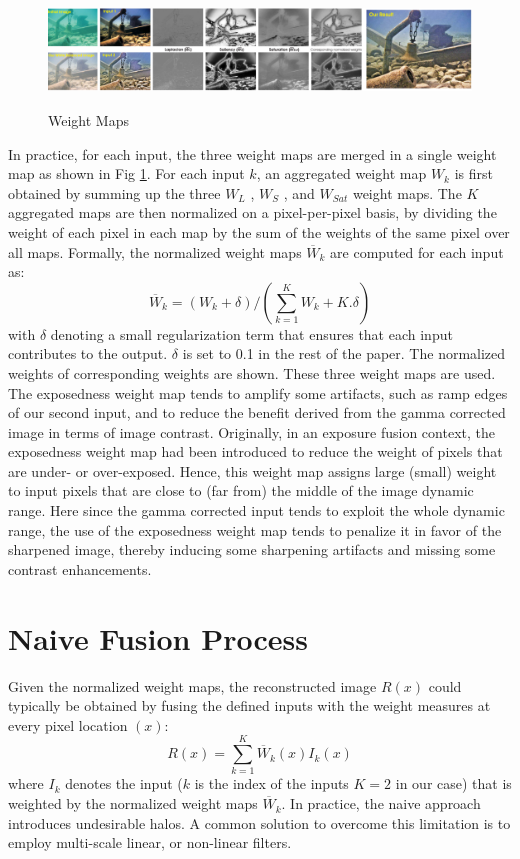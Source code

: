 \documentclass[hidelinks, 12pt]{report}
\begin{document}
\begin{figure}[H]
\centering
\includegraphics[width=15cm,height=3cm]{Weight.png}
\caption[Weight Maps]{Weight Maps}
\label{Weight}
\end{figure}
In practice, for each input, the three weight maps are merged in a single weight map as shown in Fig \ref{Weight}. For each input $k$, an aggregated weight map $W_k$ is first obtained by summing up the three $W_L$ , $W_S$ , and $W_{Sat}$ weight maps. The $K$ aggregated maps are then normalized on a pixel-per-pixel basis, by dividing the weight of each pixel in each map by the sum of the weights of the same pixel over all maps. Formally, the
normalized weight maps $\overline{W}_k$ are computed for each input as:
\begin{equation}
\overline{W}_{k}=(W_k+\delta)/(\sum_{k=1}^{K}W_k + K.\delta)
\end{equation}
with $\delta$ denoting a small regularization term that ensures that each input contributes to the output. $\delta$ is set to 0.1 in the rest of the paper. The normalized weights of corresponding weights are shown. These three weight maps are used\cite{vd}. The exposedness weight map tends to amplify some artifacts, such as ramp edges of our second input, and to reduce the benefit derived from the gamma corrected image in terms of image contrast. Originally, in an exposure fusion context, the exposedness weight map had been introduced to reduce the weight of pixels that are under- or over-exposed. Hence, this weight map assigns large (small) weight to input pixels that are close to (far from) the middle of the image dynamic range. Here since the gamma corrected input tends to exploit the whole dynamic range, the use of the exposedness weight map tends to penalize it in favor of the sharpened image, thereby inducing some sharpening artifacts and missing some contrast enhancements.

\section{Naive Fusion Process}
Given the normalized weight maps, the reconstructed image $R(x)$ could typically be obtained by fusing the defined inputs with the weight measures at every pixel location $(x)$:
\begin{equation}
R(x)=\sum_{k=1}^{K}\overline{W}_k(x)I_k(x)
\end{equation}
where $I_k$ denotes the input ($k$ is the index of the inputs $K=2$ in our case) that is weighted by the normalized weight maps $\overline{W}_k$. In practice, the naive approach introduces undesirable halos\cite{vd}. A common solution to overcome this limitation is to employ multi-scale linear, or non-linear filters.
\end{document}

